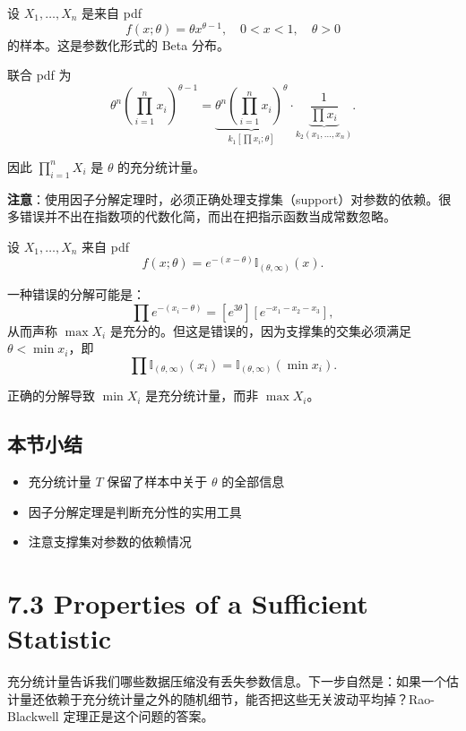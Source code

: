 \begin{example}\label{ex:product-sufficient}
设 $X_1, \ldots, X_n$ 是来自 pdf
\[
f(x; \theta) = \theta x^{\theta-1},\quad 0 < x < 1,\quad \theta > 0
\]
的样本。这是参数化形式的 Beta 分布。

联合 pdf 为
\[
\theta^n \left(\prod_{i=1}^n x_i\right)^{\theta-1} = \underbrace{\theta^n \left(\prod_{i=1}^n x_i\right)^\theta}_{k_1[\prod x_i; \theta]} \cdot \underbrace{\frac{1}{\prod x_i}}_{k_2(x_1, \ldots, x_n)}.
\]

因此 $\prod_{i=1}^n X_i$ 是 $\theta$ 的充分统计量。
\end{example}

\textbf{注意}：使用因子分解定理时，必须正确处理支撑集（support）对参数的依赖。很多错误并不出在指数项的代数化简，而出在把指示函数当成常数忽略。

\begin{example}[支撑集依赖参数的情况]\label{ex:support-dependence}
设 $X_1, \ldots, X_n$ 来自 pdf
\[
f(x; \theta) = e^{-(x-\theta)} \mathbb{I}_{(\theta, \infty)}(x).
\]

一种错误的分解可能是：
\[
\prod e^{-(x_i-\theta)} = [e^{3\theta}] [e^{-x_1-x_2-x_3}],
\]
从而声称 $\max X_i$ 是充分的。但这是错误的，因为支撑集的交集必须满足 $\theta < \min x_i$，即
\[
\prod \mathbb{I}_{(\theta, \infty)}(x_i) = \mathbb{I}_{(\theta, \infty)}(\min x_i).
\]

正确的分解导致 $\min X_i$ 是充分统计量，而非 $\max X_i$。
\end{example}

\subsection*{本节小结}

\begin{itemize}
\item 充分统计量 $T$ 保留了样本中关于 $\theta$ 的全部信息
\item 因子分解定理是判断充分性的实用工具
\item 注意支撑集对参数的依赖情况
\end{itemize}

\section{7.3 Properties of a Sufficient Statistic}\label{sec:7.3}

充分统计量告诉我们哪些数据压缩没有丢失参数信息。下一步自然是：如果一个估计量还依赖于充分统计量之外的随机细节，能否把这些无关波动平均掉？Rao-Blackwell 定理正是这个问题的答案。

